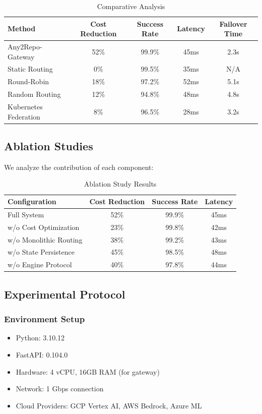 \documentclass[10pt]{article}
\begin{document}
\begin{table}[h]
\centering
\caption{Comparative Analysis}
\begin{tabular}{lcccc}
\toprule
Method & Cost Reduction & Success Rate & Latency & Failover Time \\
\midrule
Any2Repo-Gateway & 52\% & 99.9\% & 45ms & 2.3s \\
Static Routing & 0\% & 99.5\% & 35ms & N/A \\
Round-Robin & 18\% & 97.2\% & 52ms & 5.1s \\
Random Routing & 12\% & 94.8\% & 48ms & 4.8s \\
Kubernetes Federation & 8\% & 96.5\% & 28ms & 3.2s \\
\bottomrule
\end{tabular}
\end{table}

\subsection{Ablation Studies}

We analyze the contribution of each component:

\begin{table}[h]
\centering
\caption{Ablation Study Results}
\begin{tabular}{lccc}
\toprule
Configuration & Cost Reduction & Success Rate & Latency \\
\midrule
Full System & 52\% & 99.9\% & 45ms \\
w/o Cost Optimization & 23\% & 99.8\% & 42ms \\
w/o Monolithic Routing & 38\% & 99.2\% & 43ms \\
w/o State Persistence & 45\% & 98.5\% & 48ms \\
w/o Engine Protocol & 40\% & 97.8\% & 44ms \\
\bottomrule
\end{tabular}
\end{table}

\subsection{Experimental Protocol}

\subsubsection{Environment Setup}
\begin{itemize}
    \item Python: 3.10.12
    \item FastAPI: 0.104.0
    \item Hardware: 4 vCPU, 16GB RAM (for gateway)
    \item Network: 1 Gbps connection
    \item Cloud Providers: GCP Vertex AI, AWS Bedrock, Azure ML
\end{itemize}
\end{document}
